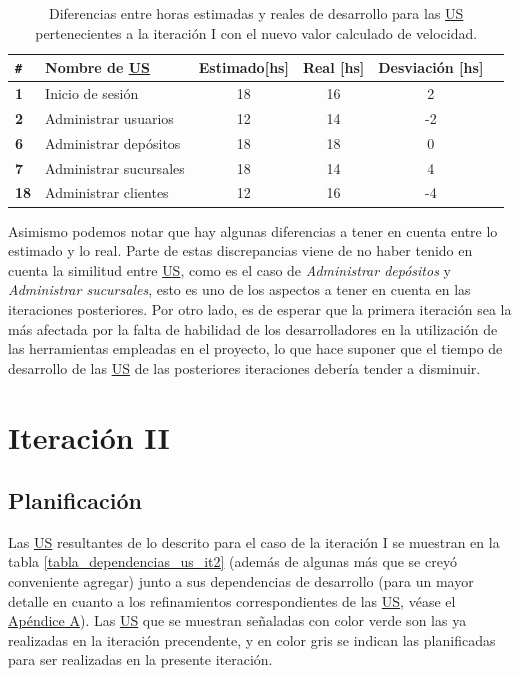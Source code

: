 \documentclass[a4paper, 12pt,twoside]{report}  %
\numberwithin{equation}{subsection} %
\begin{document}
\begin{table}[h!]
	\centering
	\captionsetup{justification=centering,margin=1.5cm}
	\begin{tabular}{ |p{0.5cm}|l|c|c|c|c| }
		\hline
		\verb|#|& \textbf{Nombre de \hyperlink{US}{US}}& \textbf{Estimado[hs]} & \textbf{Real [hs]} & \textbf{Desviación [hs]} \\
		\hline
		\textbf{1} & Inicio de sesión & 18 & 16 & \cellcolor{diferencia_estimacion_positiva}2 \\
		\hline
		\textbf{2} & Administrar usuarios & 12 & 14 & \cellcolor{diferencia_estimacion_negativa}-2 \\
		\hline
		\textbf{6} & Administrar depósitos & 18 & 18 & \cellcolor{diferencia_estimacion_positiva}0 \\
		\hline
		\textbf{7} & Administrar sucursales & 18 & 14 & \cellcolor{diferencia_estimacion_positiva}4 \\
		\hline
		\textbf{18} & Administrar clientes & 12 & 16 & \cellcolor{diferencia_estimacion_negativa}-4 \\
		\hline
	\end{tabular}
	\caption{Diferencias entre horas estimadas y reales de desarrollo para las \protect\hyperlink{US}{US} pertenecientes a la iteración I con el nuevo valor calculado de velocidad.}
	\label{tabla_dif_horas_estim_iter_1}
\end{table}

\indent Asimismo podemos notar que hay algunas diferencias a tener en cuenta entre lo estimado y lo real. Parte de estas discrepancias viene de no haber tenido en cuenta la similitud entre \hyperlink{US}{US}, como es el caso de \textit{Administrar depósitos} y \textit{Administrar sucursales}, esto es uno de los aspectos a tener en cuenta en las iteraciones posteriores. Por otro lado, es de esperar que la primera iteración sea la más afectada por la falta de habilidad de los desarrolladores en la utilización de las herramientas empleadas en el proyecto, lo que hace suponer que el tiempo de desarrollo de las \hyperlink{US}{US} de las posteriores iteraciones debería tender a disminuir.

\section{Iteración II}
\subsection{Planificación}
Las \hyperlink{US}{US} resultantes de lo descrito para el caso de la iteración I se muestran en la tabla \ref{tabla_dependencias_us_it2} (además de algunas más que se creyó conveniente agregar) junto a sus dependencias de desarrollo (para un mayor detalle en cuanto a los refinamientos correspondientes de las \hyperlink{US}{US}, véase el \hyperlink{apendice_a}{Apéndice A}). Las \hyperlink{US}{US} que se muestran señaladas con color verde son las ya realizadas en la iteración precendente, y en color gris se indican las planificadas para ser realizadas en la presente iteración.
\end{document}
